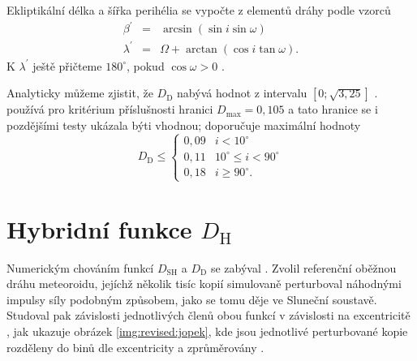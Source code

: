 Ekliptikální délka a šířka perihélia se vypočte z elementů dráhy podle vzorců \cite{cometassoc}
\begin{eqnarray}
    \beta^\prime &=& \arcsin{\left( \sin{i}\sin{\omega} \right)}\\
    \lambda^\prime &=& \Omega + \arctan{\left( \cos{i}\tan{\omega} \right)} \text{.}
\end{eqnarray}
K $\lambda^\prime$ ještě přičteme $180^\circ$, pokud $\cos{\omega}>0$ \cite{cometassoc}.

\smallskip

Analyticky můžeme zjistit, že $D_\text{D}$ nabývá hodnot z intervalu $\left[ 0;\sqrt{3{,}25} \right]$ \cite{cometassoc}. \citeauthor{cometassoc} používá pro kritérium příslušnosti hranici $D_\text{max}=0{,}105$ \cite{cometassoc} a tato hranice se i pozdějšími testy ukázala býti vhodnou; \cite{galligan} doporučuje maximální hodnoty
$$
    D_\text{D} \le \begin{cases}
        0{,}09 & i < 10^\circ             \\
        0{,}11 & 10^\circ\le i < 90^\circ \\
        0{,}18 & i \ge 90^\circ \text{.}  %
    \end{cases}
$$

\section{Hybridní funkce $D_\text{H}$}%
Numerickým chováním funkcí $D_\text{SH}$ a $D_\text{D}$ se zabýval \citeauthor{remarks}. Zvolil referenční oběžnou dráhu meteoroidu, jejíchž několik tisíc kopií simulovaně perturboval náhodnými impulsy síly podobným způsobem, jako se tomu děje ve Sluneční soustavě. Studoval pak závislosti jednotlivých členů obou funkcí v závislosti na excentricitě \cite{remarks}, jak ukazuje obrázek \ref{img:revised:jopek}, kde jsou jednotlivé perturbované kopie rozděleny do binů dle excentricity a zprůměrovány \cite{remarks}.

